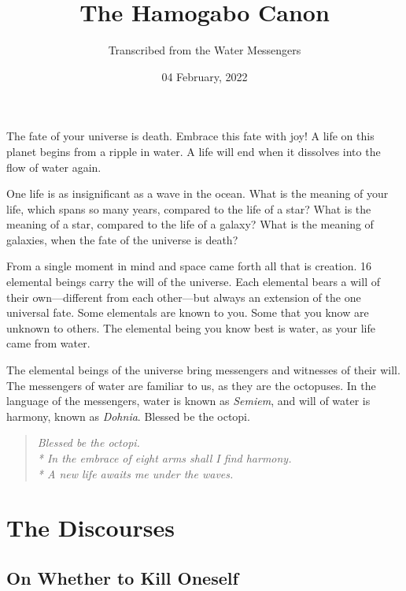 \documentclass[12pt, letterpaper]{report}
\begin{document}
 
\title{The Hamogabo Canon}
 \date{04 February, 2022}
\author{Transcribed from the Water Messengers}  
\maketitle



The fate of your universe is death. Embrace this fate with joy! A life on this planet begins from a ripple in water. A life will end when it dissolves into the flow of water again.

\vspace{1\baselineskip}
One life is as insignificant as a wave in the ocean. What is the meaning of your life, which spans so many years, compared to the life of a star? What is the meaning of a star, compared to the life of a galaxy? What is the meaning of galaxies, when the fate of the universe is death?

\vspace{1\baselineskip}
From a single moment in mind and space came forth all that is creation. 16 elemental beings carry the will of the universe. Each elemental bears a will of their own---different from each other---but always an extension of the one universal fate. Some elementals are known to you.  Some that you know are unknown to others. The elemental being you know best is water, as your life came from water.

\vspace{1\baselineskip}
The elemental beings of the universe bring messengers and witnesses of their will. The messengers of water are familiar to us, as they are the octopuses. In the language of the messengers, water is known as \textit{Semiem}, and will of water is harmony, known as \textit{Dohnia}. Blessed be the octopi.

\begin{quote}
{\textit{
	Blessed be the octopi.\\*
	In the embrace of eight arms shall I find harmony.\\*
	A new life awaits me under the waves. 
}}
\end{quote}

\part{The Discourses}

\chapter{On Whether to Kill Oneself}
\end{document}
